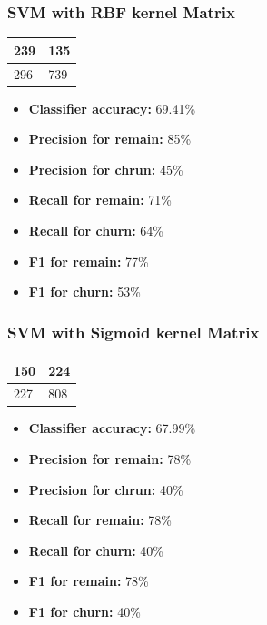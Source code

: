 \documentclass[12pt]{article}
\begin{document}
\newpage

\subsubsection{SVM with RBF kernel Matrix}
\begin{table}[ht]
  \large
  \centering
\begin{tabular}{|l|l|}
  \hline
  239 & 135\\
  \hline
  296 & 739\\
  \hline
\end{tabular}
\end{table}
\begin{itemize}
  \item \textbf{Classifier accuracy:} 69.41\%
  \item \textbf{Precision for remain:} 85\%
  \item \textbf{Precision for chrun:} 45\%
  \item \textbf{Recall for remain:} 71\%
  \item \textbf{Recall for churn:} 64\%
  \item \textbf{F1 for remain:} 77\%
  \item \textbf{F1 for churn:} 53\%
\end{itemize}

\vspace{\baselineskip}

\subsubsection{SVM with Sigmoid kernel Matrix}
\begin{table}[ht]
  \large
  \centering
\begin{tabular}{|l|l|}
  \hline
  150 & 224\\
  \hline
  227 & 808\\
  \hline
\end{tabular}
\end{table}
\begin{itemize}
  \item \textbf{Classifier accuracy:} 67.99\%
  \item \textbf{Precision for remain:} 78\%
  \item \textbf{Precision for chrun:} 40\%
  \item \textbf{Recall for remain:} 78\%
  \item \textbf{Recall for churn:} 40\%
  \item \textbf{F1 for remain:} 78\%
  \item \textbf{F1 for churn:} 40\%
\end{itemize}
\end{document}
